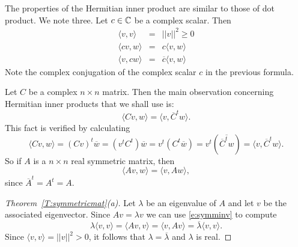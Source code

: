 \documentclass{ximera}
\begin{document}
The properties of the Hermitian inner product are similar to those of dot
product.  We note three.  Let $c\in\mbox{$\Bbb{C}$}$ be a complex scalar.  Then
\begin{eqnarray*}
\langle v,v \rangle & = & ||v||^2\ge 0\\
\langle cv,w \rangle & = & c\langle v,w \rangle \\
\langle v,cw \rangle & = & \overline{c} \langle v,w \rangle
\end{eqnarray*}
Note the complex conjugation of the complex scalar $c$ in the previous
formula.

Let $C$ be a complex $n\times n$ matrix.  Then the main observation
concerning Hermitian inner products that we shall use is:
\[
\langle Cv,w \rangle = \langle v,\overline{C}^tw \rangle.
\]
This fact is verified by calculating
\[
\langle Cv,w \rangle = (Cv)^t\overline{w} = (v^tC^t)\overline{w}
= v^t(C^t\overline{w}) = v^t(\overline{\overline{C}^tw})
= \langle v,\overline{C}^tw \rangle.
\]
So if $A$ is a $n\times n$ real symmetric matrix, then
\begin{equation}   \label{e:symminv}
\langle Av,w \rangle = \langle v,Aw \rangle,
\end{equation}
since $\overline{A}^t= A^t = A$.

\begin{proof}[Theorem~\ref{T:symmetricmat}(a)]  Let $\lambda$
be an eigenvalue of $A$ and let $v$ be the associated eigenvector. Since
$Av=\lambda v$ we can use \eqref{e:symminv} to compute
\[
\lambda \langle v,v \rangle = \langle Av,v \rangle = \langle v,Av \rangle
= \overline{\lambda} \langle v,v \rangle.
\]
Since $\langle v,v \rangle = ||v||^2 > 0$, it follows that
$\lambda=\overline{\lambda}$ and $\lambda$ is real.  \end{proof}
\end{document}
